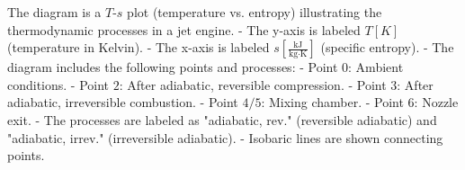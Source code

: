 The diagram is a \( T \)-\( s \) plot (temperature vs. entropy) illustrating the thermodynamic processes in a jet engine.  
- The y-axis is labeled \( T [K] \) (temperature in Kelvin).  
- The x-axis is labeled \( s [\frac{\text{kJ}}{\text{kg·K}}] \) (specific entropy).  
- The diagram includes the following points and processes:  
  - Point \( 0 \): Ambient conditions.  
  - Point \( 2 \): After adiabatic, reversible compression.  
  - Point \( 3 \): After adiabatic, irreversible combustion.  
  - Point \( 4/5 \): Mixing chamber.  
  - Point \( 6 \): Nozzle exit.  
- The processes are labeled as "adiabatic, rev." (reversible adiabatic) and "adiabatic, irrev." (irreversible adiabatic).  
- Isobaric lines are shown connecting points.